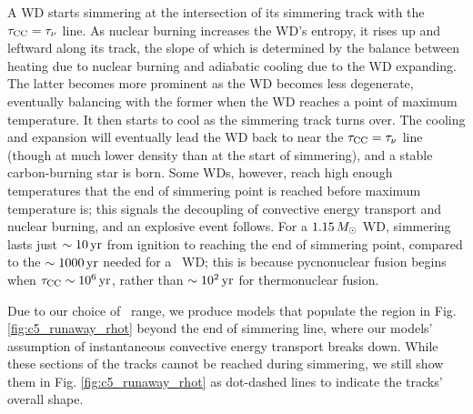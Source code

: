 A WD starts simmering at the intersection of its simmering track with the $\taucc = \taunu$ line.  As nuclear burning increases the WD's entropy, it rises up and leftward along its track, the slope of which is determined by the balance between heating due to nuclear burning and adiabatic cooling due to the WD expanding.  The latter becomes more prominent as the WD becomes less degenerate, eventually balancing with the former when the WD reaches a point of maximum temperature.  It then starts to cool as the simmering track turns over.  The cooling and expansion will eventually lead the WD back to near the $\taucc = \taunu$ line (though at much lower density than at the start of simmering), and a stable carbon-burning star is born.  Some WDs, however, reach high enough temperatures that the end of simmering point is reached before maximum temperature is; this signals the decoupling of convective energy transport and nuclear burning, and an explosive event follows.  For a $1.15\,\Msun$ WD, simmering lasts just $\sim10\,\mathrm{yr}$ from ignition to reaching the end of simmering point, compared to the $\sim1000\,\mathrm{yr}$ needed for a \Mch\ WD; this is because pycnonuclear fusion begins when $\taucc \sim 10^6\,\mrm{yr}$, rather than $\sim10^{2}\,\mathrm{yr}$ for thermonuclear fusion.



Due to our choice of \Sc\ range, we produce models that populate the region in Fig. \ref{fig:c5_runaway_rhot} beyond the end of simmering line, where our models' assumption of instantaneous convective energy transport breaks down.  While these sections of the tracks cannot be reached during simmering, we still show them in Fig. \ref{fig:c5_runaway_rhot} as dot-dashed lines to indicate the tracks' overall shape.



